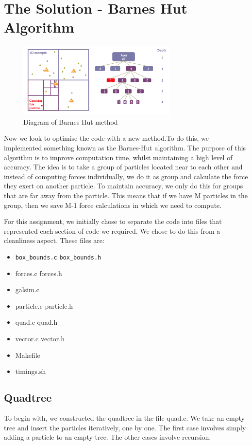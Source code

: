 \documentclass{article}
\begin{document}
\section{The Solution - Barnes Hut Algorithm}
\begin{figure}[htb]
\begin{center}
\includegraphics[width=8cm]{images/tree_walk.png}
\caption{Diagram of Barnes Hut method}
\end{center}
\end{figure}
Now we look to optimise the code with a new method.To do this, we implemented something known as the Barnes-Hut algorithm. The purpose of this algorithm is to improve computation time, whilst maintaining a high level of accuracy. The idea is to take a group of particles located near to each other and instead of computing forces individually, we do it as group and calculate the force they exert on another particle. To maintain accuracy, we only do this for groups that are far away from the particle. This means that if we have M particles in the group, then we save M-1 force calculations in which we need to compute. \vspace{0.3cm}

For this assignment, we initially  chose to separate the code into files that represented each section of code we required. We chose to do this from a cleanliness aspect. These files are:
\begin{itemize}
    \item \verb|box_bounds.c| \verb|box_bounds.h|
    \item forces.c forces.h
    \item galsim.c
    \item particle.c particle.h
    \item quad.c quad.h
    \item vector.c vector.h
    \item Makefile
    \item timings.sh
\end{itemize}
\subsection{Quadtree}
To begin with, we constructed the quadtree in the file quad.c. We take an empty tree and insert the particles iteratively, one by one. The first case involves simply adding a particle to an empty tree. The other cases involve recursion.\vspace{0.3cm}
\end{document}
